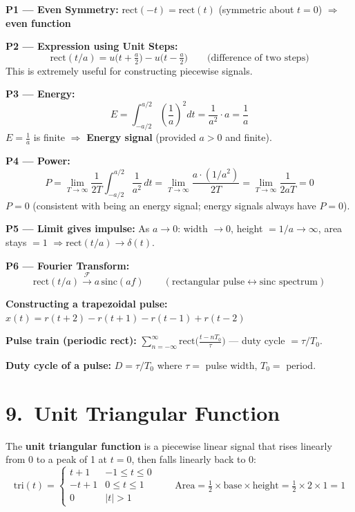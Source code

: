 \documentclass[10pt,a4paper]{article}
\begin{document}
\begin{propbox}
\textbf{P1 --- Even Symmetry:}
$\text{rect}(-t) = \text{rect}(t)$ (symmetric about $t=0$) $\Rightarrow$ \textbf{even function}

\medskip
\textbf{P2 --- Expression using Unit Steps:}
\[
  \text{rect}(t/a) = u\!\bigl(t+\tfrac{a}{2}\bigr) - u\!\bigl(t-\tfrac{a}{2}\bigr) \qquad \text{(difference of two steps)}
\]
This is extremely useful for constructing piecewise signals.

\medskip
\textbf{P3 --- Energy:}
\[
  E = \int_{-a/2}^{a/2} \left(\frac{1}{a}\right)^2 dt = \frac{1}{a^2}\cdot a = \frac{1}{a}
\]
$E=\tfrac{1}{a}$ is finite $\Rightarrow$ \textbf{Energy signal} (provided $a>0$ and finite).

\medskip
\textbf{P4 --- Power:}
\[
  P = \lim_{T\to\infty}\frac{1}{2T}\int_{-a/2}^{a/2}\frac{1}{a^2}\,dt = \lim_{T\to\infty}\frac{a\cdot(1/a^2)}{2T} = \lim_{T\to\infty}\frac{1}{2aT} = 0
\]
$P=0$ (consistent with being an energy signal; energy signals always have $P=0$).

\medskip
\textbf{P5 --- Limit gives impulse:}
As $a\to0$: width $\to0$, height $=1/a\to\infty$, area stays $=1$ $\Rightarrow \text{rect}(t/a)\to\delta(t)$.

\medskip
\textbf{P6 --- Fourier Transform:}
\[
  \text{rect}(t/a) \xrightarrow{\mathcal{F}} a\,\text{sinc}(af) \qquad (\text{rectangular pulse} \leftrightarrow \text{sinc spectrum})
\]
\end{propbox}

\begin{exbox}
\textbf{Constructing a trapezoidal pulse:}
$x(t) = r(t+2)-r(t+1)-r(t-1)+r(t-2)$

\textbf{Pulse train (periodic rect):} $\sum_{n=-\infty}^{\infty}\text{rect}\bigl(\tfrac{t-nT_0}{\tau}\bigr)$ --- duty cycle $= \tau/T_0$.

\textbf{Duty cycle of a pulse:} $D=\tau/T_0$ where $\tau=$ pulse width, $T_0=$ period.
\end{exbox}

\section{9.\ Unit Triangular Function}

\begin{defbox}
The \textbf{unit triangular function} is a piecewise linear signal that rises linearly from 0 to a peak of 1 at $t=0$, then falls linearly back to 0:
\[
  \text{tri}(t) = \begin{cases} t+1 & -1\leq t\leq 0 \\ -t+1 & 0\leq t\leq 1 \\ 0 & |t|>1 \end{cases}
  \qquad\text{Area}=\tfrac{1}{2}\times\text{base}\times\text{height}=\tfrac{1}{2}\times 2\times 1=1
\]
\end{defbox}
\end{document}
